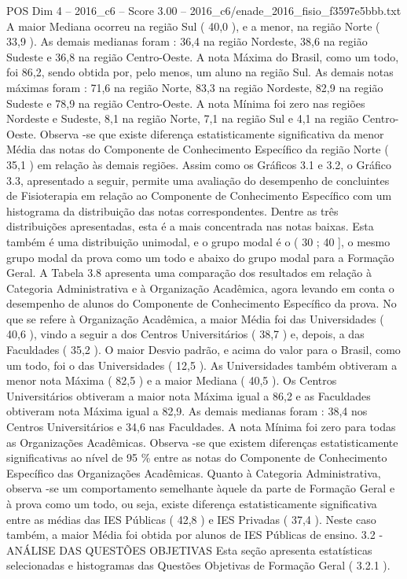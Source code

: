 \begin{textsample}{POS Dim 4 – 2016\_c6 – Score 3.00 – 2016\_c6/enade\_2016\_fisio\_f3597e5bbb.txt}
A maior Mediana ocorreu na região Sul ( 40,0 ), e a menor, na região Norte ( 33,9 ).
As demais medianas foram : 36,4 na região Nordeste, 38,6 na região Sudeste e 36,8 na região Centro-Oeste.
A nota Máxima do Brasil, como um todo, foi 86,2, sendo obtida por, pelo menos, um aluno na região Sul.
As demais notas máximas foram : 71,6 na região Norte, 83,3 na região Nordeste, 82,9 na região Sudeste e 78,9 na região Centro-Oeste.
A nota Mínima foi zero nas regiões Nordeste e Sudeste, 8,1 na região Norte, 7,1 na região Sul e 4,1 na região Centro-Oeste.
Observa -se que existe diferença estatisticamente significativa da menor Média das notas do Componente de Conhecimento Específico da região Norte ( 35,1 ) em relação às demais regiões.
Assim como os Gráficos 3.1 e 3.2, o Gráfico 3.3, apresentado a seguir, permite uma avaliação do desempenho de concluintes de Fisioterapia em relação ao Componente de Conhecimento Específico com um histograma da distribuição das notas correspondentes.
Dentre as três distribuições apresentadas, esta é a mais concentrada nas notas baixas.
Esta também é uma distribuição unimodal, e o grupo modal é o ( 30 ; 40 ], o mesmo grupo modal da prova como um todo e abaixo do grupo modal para a Formação Geral.
A Tabela 3.8 apresenta uma comparação dos resultados em relação à Categoria Administrativa e à Organização Acadêmica, agora levando em conta o desempenho de alunos do Componente de Conhecimento Específico da prova.
No que se refere à Organização Acadêmica, a maior Média foi das Universidades ( 40,6 ), vindo a seguir a dos Centros Universitários ( 38,7 ) e, depois, a das Faculdades ( 35,2 ).
O maior Desvio padrão, e acima do valor para o Brasil, como um todo, foi o das Universidades ( 12,5 ).
As Universidades também obtiveram a menor nota Máxima ( 82,5 ) e a maior Mediana ( 40,5 ).
Os Centros Universitários obtiveram a maior nota Máxima igual a 86,2 e as Faculdades obtiveram nota Máxima igual a 82,9.
As demais medianas foram : 38,4 nos Centros Universitários e 34,6 nas Faculdades.
A nota Mínima foi zero para todas as Organizações Acadêmicas.
Observa -se que existem diferenças estatisticamente significativas ao nível de 95 \% entre as notas do Componente de Conhecimento Específico das Organizações Acadêmicas.
Quanto à Categoria Administrativa, observa -se um comportamento semelhante àquele da parte de Formação Geral e à prova como um todo, ou seja, existe diferença estatisticamente significativa entre as médias das IES Públicas ( 42,8 ) e IES Privadas ( 37,4 ).
Neste caso também, a maior Média foi obtida por alunos de IES Públicas de ensino. 3.2 - ANÁLISE DAS QUESTÕES OBJETIVAS Esta seção apresenta estatísticas selecionadas e histogramas das Questões Objetivas de Formação Geral ( 3.2.1 ).

\end{textsample}
